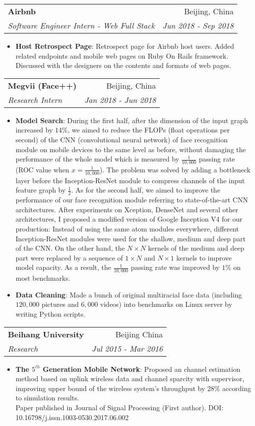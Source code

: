 \documentclass[letterpaper,11pt]{article}
\makeatletter
\newcommand{\resumeItem}[2]{
	\item\small{
		\textbf{#1}{: #2 \vspace{-2pt}}
	}
}
\newcommand{\resumeSubheading}[4]{
	\vspace{-1pt}\item
	\begin{tabular*}{0.97\textwidth}[t]{l@{\extracolsep{\fill}}r}
		\textbf{#1} & #2 \\
		\textit{\small#3} & \textit{\small #4} \\
	\end{tabular*}\vspace{-5pt}
}
\newcommand{\resumeSubSubheading}[2]{
	\begin{tabular*}{0.97\textwidth}{l@{\extracolsep{\fill}}r}
		\textit{\small#1} & \textit{\small #2} \\
	\end{tabular*}\vspace{-5pt}
}
\newcommand{\resumeSubHeadingListEnd}{\end{itemize}}
\newcommand{\resumeItemListStart}{\begin{itemize}}
\newcommand{\resumeItemListEnd}{\end{itemize}\vspace{-5pt}}
\makeatother
\begin{document}
\begin{spacing}{0.98}
	
	
	
	\resumeSubheading
	{Airbnb}{Beijing, China}
	{Software Engineer Intern - Web Full Stack}{Jun 2018 - Sep 2018}
	\resumeItemListStart
	\resumeItem{Host Retrospect Page}
	{Retrospect page for Airbnb host users. Added related endpoints and mobile web pages on Ruby On Rails framework. Discussed with the designers on the contents and formats of web pages.}
	\resumeItemListEnd
	
	\resumeSubheading
	{Megvii (Face++)}{Beijing, China}
	{Research Intern}{Jan 2018 - Jun 2018}
	\resumeItemListStart
	\resumeItem{Model Search}
	{During the first half, after the dimension of the input graph increased by $14\%$, we aimed to reduce the FLOPs (float operations per second) of the CNN (convolutional neural network) of face recognition module on mobile devices to the same level as before, without damaging the performance of the whole model which is measured by $\frac{1}{10,000}$ passing rate (ROC value when $x=\frac{1}{10,000}$). The problem was solved by adding a bottleneck layer before the Inception-ResNet module to compress channels of the input feature graph by $\frac{1}{2}$. As for the second half, we aimed to improve the performance of our face recognition module referring to state-of-the-art CNN architectures. After experiments on Xception, DenseNet and several other architectures, I proposed a modified version of Google Inception V4 for our production: Instead of using the same atom modules everywhere, different Inception-ResNet modules were used for the shallow, medium and deep part of the CNN. On the other hand, the $N \times N$ kernels of the medium and deep part were replaced by a sequence of $1 \times N$ and $N \times 1$ kernels to improve model capacity. As a result, the $\frac{1}{10,000}$ passing rate was improved by $1\%$ on most benchmarks.}
	\resumeItem{Data Cleaning}
	{Made a bunch of original multiracial face data (including $120,000$ pictures and $6,000$ videos) into benchmarks on Linux server by writing Python scripts.}
	\resumeItemListEnd
	
	\resumeSubheading
	{Beihang University}{Beijing China}
	{Research}{Jul 2015 - Mar 2016}
	\resumeItemListStart
	\resumeItem{The $5^{th}$ Generation Mobile Network}
	{Proposed an channel estimation method based on uplink wireless data and channel sparcity with supervisor, improving upper bound of the wireless system's throughput by $28\%$ according to simulation results.\\Paper published in Journal of Signal Processing (First author). DOI: 10.16798/j.issn.1003-0530.2017.06.002}
	\resumeItemListEnd
	

\end{spacing}
\end{document}
